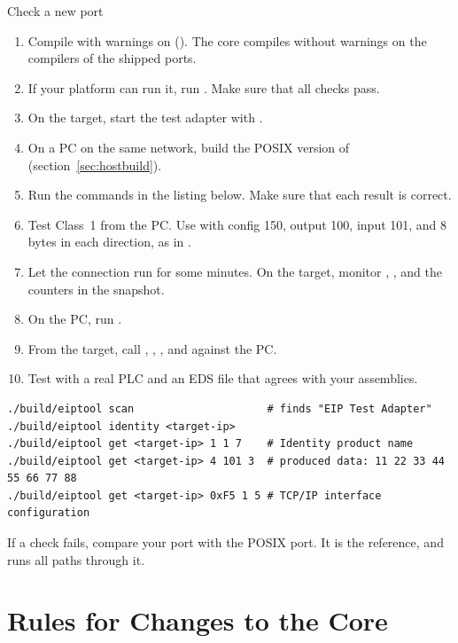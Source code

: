 \begin{procedure}{Check a new port}
\begin{enumerate}
  \item Compile with warnings on (). The core compiles
        without warnings on the compilers of the shipped ports.
  \item If your platform can run it, run . Make sure
        that all checks pass.
  \item On the target, start the test adapter with
        .
  \item On a PC on the same network, build the POSIX version of
         (section~\ref{sec:hostbuild}).
  \item Run the commands in the listing below. Make sure that each result is
        correct.
  \item Test Class~1 from the PC. Use  with config 150,
        output 100, input 101, and 8 bytes in each direction, as in
        .
  \item Let the connection run for some minutes. On the target, monitor
        , , and the 
        counters in the snapshot.
  \item On the PC, run .
  \item From the target, call ,
        , , and
         against the PC.
  \item Test with a real PLC and an EDS file that agrees with your
        assemblies.
\end{enumerate}
\end{procedure}

\begin{lstlisting}[language=shell]
./build/eiptool scan                     # finds "EIP Test Adapter"
./build/eiptool identity <target-ip>
./build/eiptool get <target-ip> 1 1 7    # Identity product name
./build/eiptool get <target-ip> 4 101 3  # produced data: 11 22 33 44 55 66 77 88
./build/eiptool get <target-ip> 0xF5 1 5 # TCP/IP interface configuration
\end{lstlisting}

If a check fails, compare your port with the POSIX port. It is the
reference, and  runs all paths through it.

\section{Rules for Changes to the Core}

